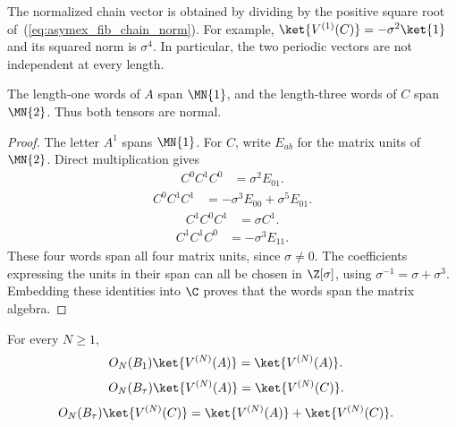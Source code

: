 The normalized chain vector is obtained by dividing by the positive
square root of~(\ref{eq:asymex_fib_chain_norm}). For example,
$\ket{V^{(1)}(C)}=-\sigma^2\ket{1}$ and its squared norm is $\sigma^4$.
In particular, the two periodic vectors are not independent at every
length.

\begin{lemma}
    \label{thm:asymex_fib_states_normal}
    \leanok
    The length-one words of $A$ span $\MN{1}$, and the length-three
    words of $C$ span $\MN{2}$. Thus both tensors are normal.
\end{lemma}

\begin{proof}
    \leanok
    The letter $A^1$ spans $\MN{1}$. For $C$, write $E_{ab}$ for
    the matrix units of $\MN{2}$. Direct multiplication gives
    \begin{align}
        C^0C^1C^0 & =\sigma^2E_{01}.
    \end{align}
    \begin{align}
        C^0C^1C^1 & =-\sigma^3E_{00}+\sigma^5E_{01}.
    \end{align}
    \begin{align}
        C^1C^0C^1 & =\sigma C^1.
    \end{align}
    \begin{align}
        C^1C^1C^0 & =-\sigma^3E_{11}.
    \end{align}
    These four words span all four matrix units, since $\sigma\neq0$.
    The coefficients expressing the units in their span can all be
    chosen in $\Z[\sigma]$, using
    $\sigma^{-1}=\sigma+\sigma^3$.
    Embedding these identities into $\C$ proves that the words span the
    matrix algebra.
\end{proof}

\begin{lemma}
    \label{thm:asymex_fib_state_action}
    \leanok
    For every $N\geq1$,
    \begin{align}
        O_N(B_1)\ket{V^{(N)}(A)}
         & =\ket{V^{(N)}(A)}.
        \label{eq:asymex_fib_action_unit}
    \end{align}
    \begin{align}
        O_N(B_\tau)\ket{V^{(N)}(A)}
         & =\ket{V^{(N)}(C)}.
        \label{eq:asymex_fib_action_product}
    \end{align}
    \begin{align}
        O_N(B_\tau)\ket{V^{(N)}(C)}
         & =\ket{V^{(N)}(A)}+\ket{V^{(N)}(C)}.
        \label{eq:asymex_fib_action_chain}
    \end{align}
\end{lemma}

